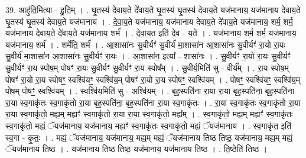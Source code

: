 \documentclass[17pt]{extarticle}
\begin{document}
39. आहु॑ति॒मित्या - हु॒ति॒म् । . घृ॒तस्य॑ देवाय॒ते दे॑वाय॒ते घृ॒तस्य॑ घृ॒तस्य॑ देवाय॒ते यज॑मानाय॒ यज॑मानाय देवाय॒ते घृ॒तस्य॑ घृ॒तस्य॑ देवाय॒ते यज॑मानाय । . दे॒वा॒य॒ते यज॑मानाय॒ यज॑मानाय देवाय॒ते दे॑वाय॒ते यज॑मानाय॒ शर्म॒ शर्म॒ यज॑मानाय देवाय॒ते दे॑वाय॒ते यज॑मानाय॒ शर्म॑ । . दे॒वा॒य॒त इति॑ देव - य॒ते । . यज॑मानाय॒ शर्म॒ शर्म॒ यज॑मानाय॒ यज॑मानाय॒ शर्म॑ । . शर्मेति॒ शर्म॑ । . आ॒शासा॑नः सु॒वीर्यꣳ॑ सु॒वीर्य॑ मा॒शासा॑न आ॒शासा॑नः सु॒वीर्यꣳ॑ रा॒यो रा॒यः सु॒वीर्य॑ मा॒शासा॑न आ॒शासा॑नः सु॒वीर्यꣳ॑ रा॒यः । . आ॒शासा॑न॒ इत्या᳚ - शासा॑नः । . सु॒वीर्यꣳ॑ रा॒यो रा॒यः सु॒वीर्यꣳ॑ सु॒वीर्यꣳ॑ रा॒य स्पोष॒म् पोषꣳ॑ रा॒यः सु॒वीर्यꣳ॑ सु॒वीर्यꣳ॑ रा॒य स्पोष᳚म् । . सु॒वीर्य॒मिति॑ सु - वीर्य᳚म् । . रा॒य स्पोष॒म् पोषꣳ॑ रा॒यो रा॒य स्पोषꣳ॒॒ स्वश्वि॑यꣳ॒॒ स्वश्वि॑य॒म् पोषꣳ॑ रा॒यो रा॒य स्पोषꣳ॒॒ स्वश्वि॑यम् । . पोषꣳ॒॒ स्वश्वि॑यꣳ॒॒ स्वश्वि॑य॒म् पोष॒म् पोषꣳ॒॒ स्वश्वि॑यम् । . स्वश्वि॑य॒मिति॑ सु - अश्वि॑यम् । . बृह॒स्पति॑ना रा॒या रा॒या बृह॒स्पति॑ना॒ बृह॒स्पति॑ना रा॒या स्व॒गाकृ॑तः स्व॒गाकृ॑तो रा॒या बृह॒स्पति॑ना॒ बृह॒स्पति॑ना रा॒या स्व॒गाकृ॑तः । . रा॒या स्व॒गाकृ॑तः स्व॒गाकृ॑तो रा॒या रा॒या स्व॒गाकृ॑तो॒ मह्य॒म् मह्यꣳ॑ स्व॒गाकृ॑तो रा॒या रा॒या स्व॒गाकृ॑तो॒ मह्य᳚म् । . स्व॒गाकृ॑तो॒ मह्य॒म् मह्यꣳ॑ स्व॒गाकृ॑तः स्व॒गाकृ॑तो॒ मह्यं॒ ॅयज॑मानाय॒ यज॑मानाय॒ मह्यꣳ॑ स्व॒गाकृ॑तः स्व॒गाकृ॑तो॒ मह्यं॒ ॅयज॑मानाय । . स्व॒गाकृ॑त॒ इति॑ स्व॒गा - कृ॒तः॒ । . मह्यं॒ ॅयज॑मानाय॒ यज॑मानाय॒ मह्य॒म् मह्यं॒ ॅयज॑मानाय तिष्ठ तिष्ठ॒ यज॑मानाय॒ मह्य॒म् मह्यं॒ ॅयज॑मानाय तिष्ठ । . यज॑मानाय तिष्ठ तिष्ठ॒ यज॑मानाय॒ यज॑मानाय तिष्ठ । . ति॒ष्ठेति॑ तिष्ठ । \newline
\pagebreak
{}
\end{document}
